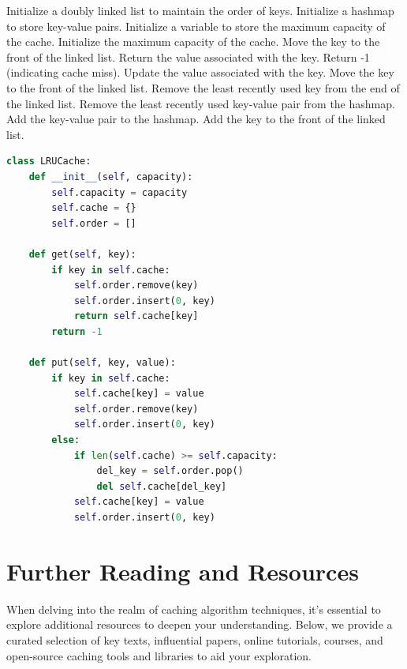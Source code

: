 \documentclass[12pt]{book} %
\begin{document}
\FloatBarrier
\begin{algorithm}
\caption{LRU Cache Implementation}
\begin{algorithmic}[1]
\State Initialize a doubly linked list to maintain the order of keys.
\State Initialize a hashmap to store key-value pairs.
\State Initialize a variable to store the maximum capacity of the cache.
    \State Initialize the maximum capacity of the cache.
\EndProcedure
{}
        \State Move the key to the front of the linked list.
        \State Return the value associated with the key.
    \Else
        \State Return -1 (indicating cache miss).
    \EndIf
\EndProcedure
{}
        \State Update the value associated with the key.
        \State Move the key to the front of the linked list.
    \Else
            \State Remove the least recently used key from the end of the linked list.
            \State Remove the least recently used key-value pair from the hashmap.
        \EndIf
        \State Add the key-value pair to the hashmap.
        \State Add the key to the front of the linked list.
    \EndIf
\EndProcedure
\end{algorithmic}
\end{algorithm}
\FloatBarrier

\begin{lstlisting}[language=Python, caption=Python Implementation of LRU Cache]
class LRUCache:
    def __init__(self, capacity):
        self.capacity = capacity
        self.cache = {}
        self.order = []

    def get(self, key):
        if key in self.cache:
            self.order.remove(key)
            self.order.insert(0, key)
            return self.cache[key]
        return -1

    def put(self, key, value):
        if key in self.cache:
            self.cache[key] = value
            self.order.remove(key)
            self.order.insert(0, key)
        else:
            if len(self.cache) >= self.capacity:
                del_key = self.order.pop()
                del self.cache[del_key]
            self.cache[key] = value
            self.order.insert(0, key)
\end{lstlisting}


\section{Further Reading and Resources}
When delving into the realm of caching algorithm techniques, it's essential to explore additional resources to deepen your understanding. Below, we provide a curated selection of key texts, influential papers, online tutorials, courses, and open-source caching tools and libraries to aid your exploration.
\end{document}
